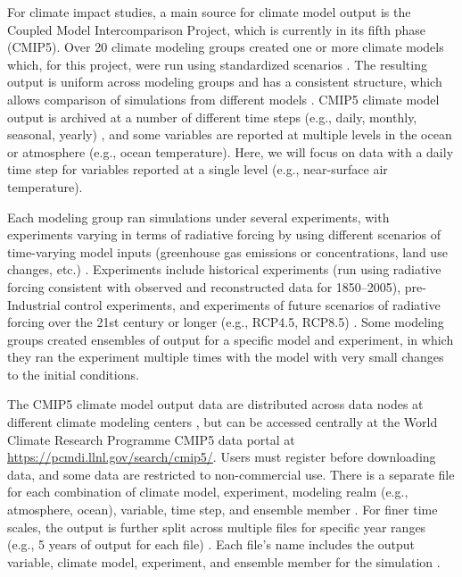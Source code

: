 For climate impact studies, a main source for climate model output is
the Coupled Model Intercomparison Project, which is currently in its
fifth phase (CMIP5). Over 20 climate modeling groups created one or more
climate models which, for this project, were run using standardized
scenarios \citep{taylor2012overview}. The resulting output is uniform
across modeling groups and has a consistent structure, which allows
comparison of simulations from different models \citep{IPCCch9}. CMIP5
climate model output is archived at a number of different time steps
(e.g., daily, monthly, seasonal, yearly) \citep{taylor2010cmip5}, and
some variables are reported at multiple levels in the ocean or
atmosphere (e.g., ocean temperature). Here, we will focus on data with a
daily time step for variables reported at a single level (e.g.,
near-surface air temperature).

Each modeling group ran simulations under several experiments, with
experiments varying in terms of radiative forcing by using different
scenarios of time-varying model inputs (greenhouse gas emissions or
concentrations, land use changes, etc.)
\citep{taylor2012overview, IPCCch9}. Experiments include historical
experiments (run using radiative forcing consistent with observed and
reconstructed data for 1850--2005), pre-Industrial control experiments,
and experiments of future scenarios of radiative forcing over the 21st
century or longer (e.g., RCP4.5, RCP8.5) \citep{taylor2012overview}.
Some modeling groups created ensembles of output for a specific model
and experiment, in which they ran the experiment multiple times with the
model with very small changes to the initial conditions.

The CMIP5 climate model output data are distributed across data nodes at
different climate modeling centers \citep{taylor2012overview}, but can
be accessed centrally at the World Climate Research Programme CMIP5 data
portal at \url{https://pcmdi.llnl.gov/search/cmip5/}. Users must
register before downloading data, and some data are restricted to
non-commercial use. There is a separate file for each combination of
climate model, experiment, modeling realm (e.g., atmosphere, ocean),
variable, time step, and ensemble member
\citep{taylor2012overview, taylor2010cmip5}. For finer time scales, the
output is further split across multiple files for specific year ranges
(e.g., 5 years of output for each file) \citep{taylor2010cmip5}. Each
file's name includes the output variable, climate model, experiment, and
ensemble member for the simulation \citep{taylor2010cmip5}.

